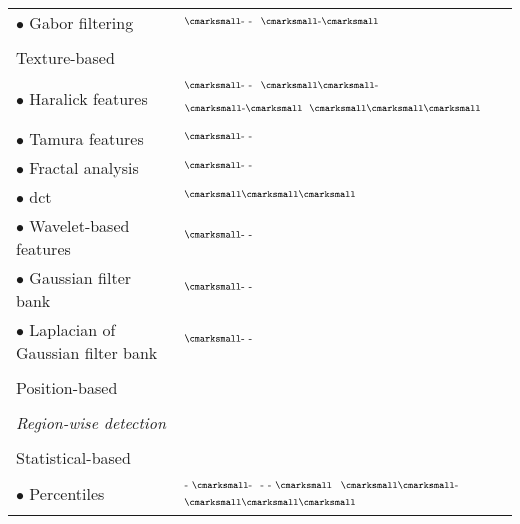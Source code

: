 \begin{longtable}{@{}l >{\raggedleft\arraybackslash}X@{}}
  \quad \quad \quad $\bullet$ Gabor filtering & $^{\text{{\cmarksmall}- -}}$\cite{Tiwari2012,Viswanath2008,Viswanath2012} $^{\text{{\cmarksmall}-{\cmarksmall}}}$\cite{khalvati2015automated,chung2015prostate}  \\ \\ [-1.5ex]
  \quad \quad Texture-based & \\
  \quad \quad \quad $\bullet$ Haralick features & $^{\text{{\cmarksmall}- -}}$\cite{Antic2013,Tiwari2009a,Tiwari2010,Tiwari2013,Viswanath2008,Viswanath2009,Viswanath2012,trigui2016classification,rampun2015computer,rampun2016computer,rampun2016quantitative} $^{\text{{\cmarksmall}{\cmarksmall}-}}$\cite{Viswanath2011} $^{\text{{\cmarksmall}-{\cmarksmall}}}$\cite{cameron2014multiparametric,cameron2016maps,khalvati2015automated,chung2015prostate} $^{\text{{\cmarksmall}{\cmarksmall}{\cmarksmall}}}$\cite{Litjens2012,Niaf2011,Niaf2012,lehaire2014computer} \\
  \quad \quad \quad $\bullet$ Tamura features & $^{\text{{\cmarksmall}- -}}$\cite{rampun2016computer,rampun2016quantitative,rampun2015computer} \\
  \quad \quad \quad $\bullet$ Fractal analysis & $^{\text{{\cmarksmall}- -}}$\cite{Lopes2011,Lv2009} \\
  \quad \quad \quad $\bullet$ \acs*{dct} & $^{\text{{\cmarksmall}{\cmarksmall}{\cmarksmall}}}$\cite{Chan2003} \\
  \quad \quad \quad $\bullet$ Wavelet-based features & $^{\text{{\cmarksmall}- -}}$\cite{Viswanath2012} \\
  \quad \quad \quad $\bullet$ Gaussian filter bank & $^{\text{{\cmarksmall}- -}}$\cite{Litjens2014,rampun2016computer,rampun2016quantitative,rampun2015computer} \\
  \quad \quad \quad $\bullet$ Laplacian of Gaussian filter bank & $^{\text{{\cmarksmall}- -}}$\cite{rampun2016computer,rampun2016quantitative,rampun2015computer} \\ \\ [-1.5ex]
  \quad \quad Position-based & \cite{Chan2003,Litjens2011,Litjens2012,Litjens2014} \\ \\ [-1.5ex]
  \quad \textit{Region-wise detection} &  \\ \\ [-1.5ex]
  \quad \quad Statistical-based & \\
  \quad \quad \quad $\bullet$ Percentiles & $^{\text{- {\cmarksmall}-}}$\cite{Vos2008a}  $^{\text{- - {\cmarksmall}}}$\cite{Antic2013,Peng2013} $^{\text{{\cmarksmall}{\cmarksmall}-}}$\cite{Vos2010} $^{\text{{\cmarksmall}{\cmarksmall}{\cmarksmall}}}$\cite{Litjens2011,Litjens2012,Litjens2014,Niaf2011,Niaf2012,Vos2012,lehaire2014computer} \\

\end{longtable}
